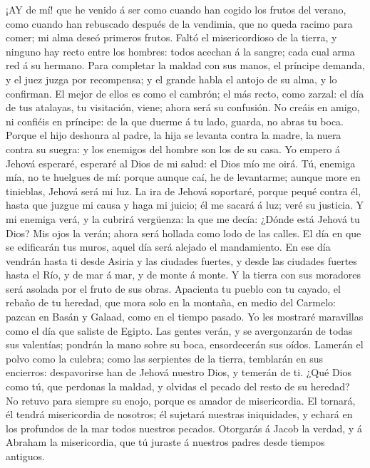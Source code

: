  ¡AY de mí! que he venido á ser como cuando han cogido los
frutos del verano, como cuando han rebuscado después de la vendimia, que
no queda racimo para comer; mi alma deseó primeros frutos. 
Faltó el misericordioso de la tierra, y ninguno hay recto entre los
hombres: todos acechan á la sangre; cada cual arma red á su hermano.
 Para completar la maldad con sus manos, el príncipe
demanda, y el juez juzga por recompensa; y el grande habla el antojo de
su alma, y lo confirman.  El mejor de ellos es como el
cambrón; el más recto, como zarzal: el día de tus atalayas, tu
visitación, viene; ahora será su confusión.  No creáis en
amigo, ni confiéis en príncipe: de la que duerme á tu lado, guarda, no
abras tu boca.  Porque el hijo deshonra al padre, la hija se
levanta contra la madre, la nuera contra su suegra: y los enemigos del
hombre son los de su casa.  Yo empero á Jehová esperaré,
esperaré al Dios de mi salud: el Dios mío me oirá.  Tú,
enemiga mía, no te huelgues de mí: porque aunque caí, he de levantarme;
aunque more en tinieblas, Jehová será mi luz.  La ira de
Jehová soportaré, porque pequé contra él, hasta que juzgue mi causa y
haga mi juicio; él me sacará á luz; veré su justicia.  Y mi
enemiga verá, y la cubrirá vergüenza: la que me decía: ¿Dónde está
Jehová tu Dios? Mis ojos la verán; ahora será hollada como lodo de las
calles.  El día en que se edificarán tus muros, aquel día
será alejado el mandamiento.  En ese día vendrán hasta ti
desde Asiria y las ciudades fuertes, y desde las ciudades fuertes hasta
el Río, y de mar á mar, y de monte á monte.  Y la tierra
con sus moradores será asolada por el fruto de sus obras. 
Apacienta tu pueblo con tu cayado, el rebaño de tu heredad, que mora
solo en la montaña, en medio del Carmelo: pazcan en Basán y Galaad, como
en el tiempo pasado.  Yo les mostraré maravillas como el
día que saliste de Egipto.  Las gentes verán, y se
avergonzarán de todas sus valentías; pondrán la mano sobre su boca,
ensordecerán sus oídos.  Lamerán el polvo como la culebra;
como las serpientes de la tierra, temblarán en sus encierros:
despavorirse han de Jehová nuestro Dios, y temerán de ti. 
¿Qué Dios como tú, que perdonas la maldad, y olvidas el pecado del resto
de su heredad? No retuvo para siempre su enojo, porque es amador de
misericordia.  El tornará, él tendrá misericordia de
nosotros; él sujetará nuestras iniquidades, y echará en los profundos de
la mar todos nuestros pecados.  Otorgarás á Jacob la
verdad, y á Abraham la misericordia, que tú juraste á nuestros padres
desde tiempos antiguos.
